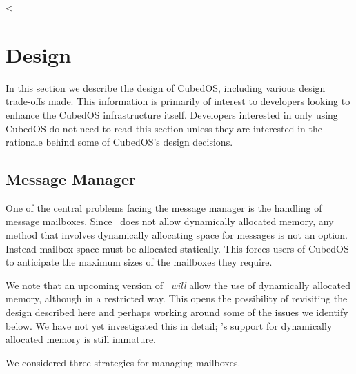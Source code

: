 <
\chapter{Design}
\label{chapt:design}

In this section we describe the design of CubedOS, including various design trade-offs made.
This information is primarily of interest to developers looking to enhance the CubedOS
infrastructure itself. Developers interested in only using CubedOS do not need to read this
section unless they are interested in the rationale behind some of CubedOS's design decisions.

\section{Message Manager}
\label{sec:design-message-manager}

One of the central problems facing the message manager is the handling of message mailboxes.
Since \SPARK\ does not allow dynamically allocated memory, any method that involves dynamically
allocating space for messages is not an option. Instead mailbox space must be allocated
statically. This forces users of CubedOS to anticipate the maximum sizes of the mailboxes they
require.

We note that an upcoming version of \SPARK\ \emph{will} allow the use of dynamically allocated
memory, although in a restricted way. This opens the possibility of revisiting the design
described here and perhaps working around some of the issues we identify below. We have not yet
investigated this in detail; \SPARK's support for dynamically allocated memory is still
immature.

We considered three strategies for managing mailboxes.

